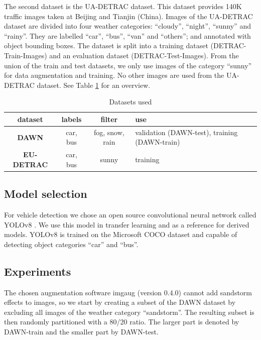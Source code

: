 \documentclass[]{article}
\begin{document}
	The second dataset is the UA-DETRAC \cite{CVIU_UA-DETRAC} dataset. This dataset provides 140K traffic images taken at Beijing and Tianjin (China). Images of the UA-DETRAC dataset are divided into four weather categories: ``cloudy'', ``night'', ``sunny'' and ``rainy''. They are labelled ``car'', ``bus'', ``van'' and ``others''; and annotated with object bounding boxes. The dataset is split into a training dataset (DETRAC-Train-Images) and an evaluation dataset (DETRAC-Test-Images).   From the union of the train and test datasets, we only use images of the category ``sunny'' for data augmentation and training. No other images are used from the UA-DETRAC dataset. See Table \ref{table:datasets} for an overview.
	
	\begin{table}[H]
		\centering
		\begin{tabular}{cccp{1.5in}}
			\toprule
			\textbf{dataset} & \textbf{labels} & \textbf{filter} & \textbf{use} \\
			\midrule
			\textbf{DAWN} & car, bus & fog, snow, rain & validation (DAWN-test), training (DAWN-train) \\
			\textbf{EU-DETRAC} & car, bus & sunny & training \\
			\bottomrule
		\end{tabular}
		\caption{Datasets used}
		\label{table:datasets}
	\end{table}

\subsection{Model selection}
 
	For vehicle detection we chose an open source convolutional neural network called YOLO{\small v8} \cite{yolov8_ultralytics}. We use this model in transfer learning and as a reference for derived models. YOLO{\small v8} is trained on the Microsoft COCO dataset \cite{linMicrosoftCOCOCommon2015a} and capable of detecting object categories ``car'' and ``bus''.

\subsection{Experiments}

	The chosen augmentation software imgaug \cite{imgaug} (version 0.4.0) cannot add sandstorm effects to images, so we start by creating a subset of the DAWN dataset by excluding all images of the weather category ``sandstorm''. The resulting subset is then randomly partitioned with a 80/20 ratio. The larger part is denoted by DAWN-train and the smaller part by DAWN-test.
\end{document}
